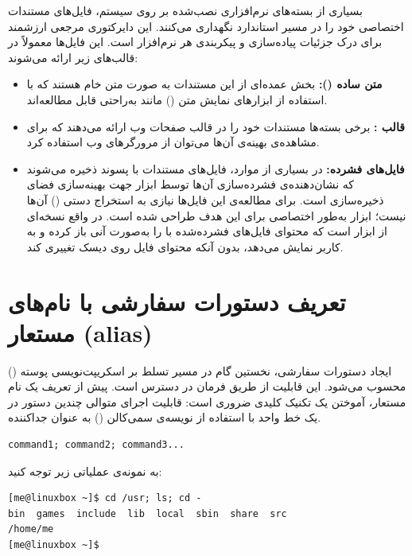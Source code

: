بسیاری از بسته‌های نرم‌افزاری نصب‌شده بر روی سیستم، فایل‌های مستندات اختصاصی خود را در مسیر استاندارد  نگهداری می‌کنند. این دایرکتوری مرجعی ارزشمند برای درک جزئیات پیاده‌سازی و پیکربندی هر نرم‌افزار است. این فایل‌ها معمولاً در قالب‌های زیر ارائه می‌شوند:

\begin{itemize}
  \item \textbf{متن ساده ():} بخش عمده‌ای از این مستندات به صورت متن خام هستند که با استفاده از ابزارهای نمایش متن () مانند  به‌راحتی قابل مطالعه‌اند.

  \item \textbf{قالب :} برخی بسته‌ها مستندات خود را در قالب صفحات وب ارائه می‌دهند که برای مشاهده‌ی بهینه‌ی آن‌ها می‌توان از مرورگرهای وب استفاده کرد.

  \item \textbf{فایل‌های فشرده:} در بسیاری از موارد، فایل‌های مستندات با پسوند  ذخیره می‌شوند که نشان‌دهنده‌ی فشرده‌سازی آن‌ها توسط ابزار  جهت بهینه‌سازی فضای ذخیره‌سازی است. برای مطالعه‌ی این فایل‌ها نیازی به استخراج دستی () آن‌ها نیست؛ ابزار  به‌طور اختصاصی برای این هدف طراحی شده است.  در واقع نسخه‌ای از ابزار  است که محتوای فایل‌های فشرده‌شده با  را به‌صورت آنی باز کرده و به کاربر نمایش می‌دهد، بدون آنکه محتوای فایل روی دیسک تغییری کند.
\end{itemize}

\section{تعریف دستورات سفارشی با نام‌های مستعار (alias)}

ایجاد دستورات سفارشی، نخستین گام در مسیر تسلط بر اسکریپت‌نویسی پوسته () محسوب می‌شود. این قابلیت از طریق فرمان  در دسترس است. پیش از تعریف یک نام مستعار، آموختن یک تکنیک کلیدی ضروری است: قابلیت اجرای متوالی چندین دستور در یک خط واحد با استفاده از نویسه‌ی سمی‌کالن (\cmd{;}) به عنوان جداکننده.

\begin{latin}
\begin{lstlisting}
command1; command2; command3...
\end{lstlisting}
\end{latin}

به نمونه‌ی عملیاتی زیر توجه کنید:

\begin{latin}
\begin{lstlisting}
[me@linuxbox ~]$ cd /usr; ls; cd -
bin  games  include  lib  local  sbin  share  src
/home/me
[me@linuxbox ~]$
\end{lstlisting}
\end{latin}

